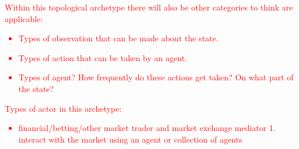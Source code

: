 \textcolor{red}{Within this topological archetype there will also be other categories to think are applicable:
\begin{itemize}
\item{Types of observation that can be made about the state.}
\item{Types of action that can be taken by an agent.}
\item{Types of agent? How frequently do these actions get taken? On what part of the state?}
\end{itemize}
}

\textcolor{red}{Types of actor in this archetype:
\begin{itemize}
\item{financial/betting/other market trader and market exchange mediator 1. interact with the market using an agent or collection of agents}
\end{itemize}}

